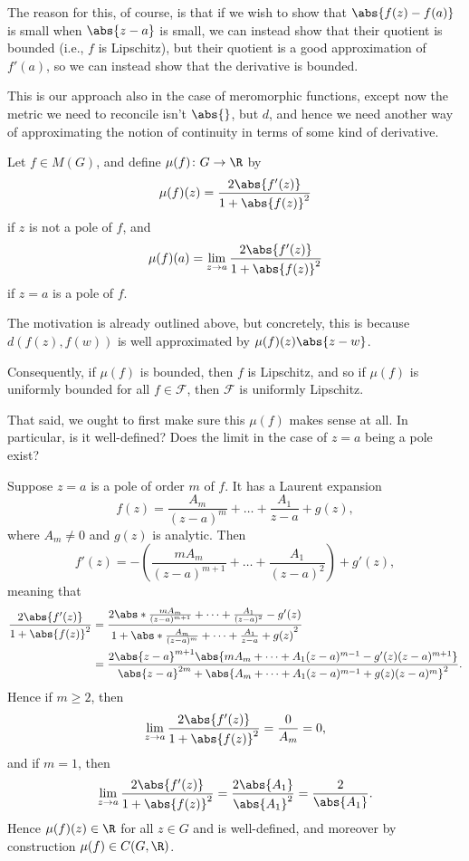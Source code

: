 The reason for this, of course, is that if we wish to show that $\abs{f(z) - f(a)}$ is small when $\abs{z - a}$ is small, we can instead show that their quotient is bounded (i.e., $f$ is Lipschitz), but their quotient is a good approximation of $f'(a)$, so we can instead show that the derivative is bounded.

This is our approach also in the case of meromorphic functions, except now the metric we need to reconcile isn't $\abs{}$, but $d$, and hence we need another way of approximating the notion of continuity in terms of some kind of derivative.

\begin{definition}\label{defmu}
	Let $f \in M(G)$, and define $\mu(f) \colon G \to \R$ by
	\[
		\mu(f)(z) = \frac{2 \abs{f'(z)}}{1 + \abs{f(z)}^2}
	\]
	if $z$ is not a pole of $f$, and
	\[
		\mu(f)(a) = \lim_{z \to a} \frac{2 \abs{f'(z)}}{1 + \abs{f(z)}^2}
	\]
	if $z = a$ is a pole of $f$.
\end{definition}

The motivation is already outlined above, but concretely, this is because $d(f(z), f(w))$ is well approximated by $\mu(f)(z) \abs{z - w}$.

Consequently, if $\mu(f)$ is bounded, then $f$ is Lipschitz, and so if $\mu(f)$ is uniformly bounded for all $f \in \mathcal{F}$, then $\mathcal{F}$ is uniformly Lipschitz.

That said, we ought to first make sure this $\mu(f)$ makes sense at all.
In particular, is it well-defined? Does the limit in the case of $z = a$ being a pole exist?

Suppose $z = a$ is a pole of order $m$ of $f$.
It has a Laurent expansion
\[
	f(z) = \frac{A_m}{(z - a)^m} + \dots + \frac{A_1}{z - a} + g(z),
\]
where $A_m \neq 0$ and $g(z)$ is analytic.
Then
\[
	f'(z) = - \left ( \frac{m A_m}{(z - a)^{m + 1}} + \dots + \frac{A_1}{(z - a)^2} \right ) + g'(z),
\]
meaning that
\begin{align*}
	\frac{2 \abs{f'(z)}}{1 + \abs{f(z)}^2} &= \frac{2 \abs*{ \frac{m A_m}{(z - a)^{m + 1}} + \dots + \frac{A_1}{(z - a)^2} - g'(z) }}{1 + \abs*{\frac{A_m}{(z - a)^m} + \dots + \frac{A_1}{z - a} + g(z)}^2} \\
	&= \frac{2 \abs{z - a}^{m + 1} \abs{m A_m + \dots + A_1(z - a)^{m - 1} - g'(z) (z - a)^{m + 1}}}{\abs{z - a}^{2 m} + \abs{A_m + \dots + A_1(z - a)^{m - 1} + g(z) (z - a)^{m}}^2}.
\end{align*}
Hence if $m \geq 2$, then
\[
	\lim_{z \to a} \frac{2 \abs{f'(z)}}{1 + \abs{f(z)}^2} = \frac{0}{A_m} = 0,
\]
and if $m = 1$, then
\[
	\lim_{z \to a} \frac{2 \abs{f'(z)}}{1 + \abs{f(z)}^2} = \frac{2 \abs{A_1}}{\abs{A_1}^2} = \frac{2}{\abs{A_1}}.
\]
Hence $\mu(f)(z) \in \R$ for all $z \in G$ and is well-defined, and moreover by construction $\mu(f) \in C(G, \R)$.

